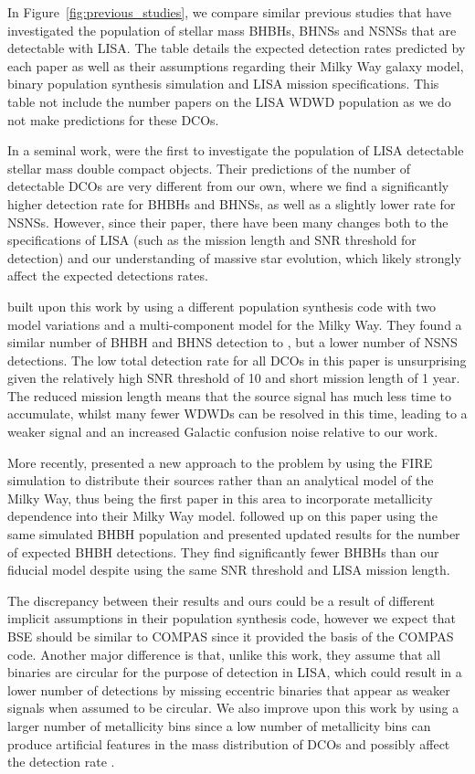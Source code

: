 In Figure~\ref{fig:previous_studies}, we compare similar previous studies that have investigated the population of stellar mass BHBHs, BHNSs and NSNSs that are detectable with LISA. The table details the expected detection rates predicted by each paper as well as their assumptions regarding their Milky Way galaxy model, binary population synthesis simulation and LISA mission specifications. This table not include the number papers on the LISA WDWD population as we do not make predictions for these DCOs.

In a seminal work, \citet{Nelemans+2001} were the first to investigate the population of LISA detectable stellar mass double compact objects. Their predictions of the number of detectable DCOs are very different from our own, where we find a significantly higher detection rate for BHBHs and BHNSs, as well as a slightly lower rate for NSNSs. However, since their paper, there have been many changes both to the specifications of LISA (such as the mission length and SNR threshold for detection) and our understanding of massive star evolution, which likely strongly affect the expected detections rates.

\citet{Belczynski+2010} built upon this work by using a different population synthesis code with two model variations and a multi-component model for the Milky Way. They found a similar number of BHBH and BHNS detection to \citet{Nelemans+2001}, but a lower number of NSNS detections. The low total detection rate for all DCOs in this paper is unsurprising given the relatively high SNR threshold of 10 and short mission length of 1 year. The reduced mission length means that the source signal has much less time to accumulate, whilst many fewer WDWDs can be resolved in this time, leading to a weaker signal and an increased Galactic confusion noise relative to our work.

More recently, \citet{Lamberts+2018} presented a new approach to the problem by using the FIRE simulation \citep{Hopkins+2014} to distribute their sources rather than an analytical model of the Milky Way, thus being the first paper in this area to incorporate metallicity dependence into their Milky Way model. \citet{Sesana+2020} followed up on this paper using the same simulated BHBH population and presented updated results for the number of expected BHBH detections. They find significantly fewer BHBHs than our fiducial model despite using the same SNR threshold and LISA mission length.

The discrepancy between their results and ours could be a result of different implicit assumptions in their population synthesis code, however we expect that BSE should be similar to COMPAS since it provided the basis of the COMPAS code. Another major difference is that, unlike this work, they assume that all binaries are circular for the purpose of detection in LISA, which could result in a lower number of detections by missing eccentric binaries that appear as weaker signals when assumed to be circular. We also improve upon this work by using a larger number of metallicity bins since a low number of metallicity bins can produce artificial features in the mass distribution of DCOs and possibly affect the detection rate .

